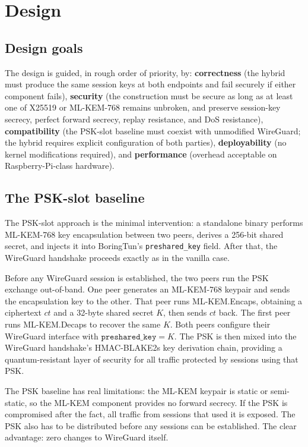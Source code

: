 \documentclass[11pt,a4paper]{article}
\begin{document}
\section{Design}
\label{sec:design}

\subsection{Design goals}

The design is guided, in rough order of priority, by: \textbf{correctness} (the hybrid must produce the same session keys at both endpoints and fail securely if either component fails), \textbf{security} (the construction must be secure as long as at least one of X25519 or ML-KEM-768 remains unbroken, and preserve session-key secrecy, perfect forward secrecy, replay resistance, and DoS resistance), \textbf{compatibility} (the PSK-slot baseline must coexist with unmodified WireGuard; the hybrid requires explicit configuration of both parties), \textbf{deployability} (no kernel modifications required), and \textbf{performance} (overhead acceptable on Raspberry-Pi-class hardware).

\subsection{The PSK-slot baseline}

The PSK-slot approach is the minimal intervention: a standalone binary performs ML-KEM-768 key encapsulation between two peers, derives a 256-bit shared secret, and injects it into BoringTun's \texttt{preshared\_key} field. After that, the WireGuard handshake proceeds exactly as in the vanilla case.

Before any WireGuard session is established, the two peers run the PSK exchange out-of-band. One peer generates an ML-KEM-768 keypair and sends the encapsulation key to the other. That peer runs ML-KEM.Encaps, obtaining a ciphertext $\mathit{ct}$ and a 32-byte shared secret $K$, then sends $\mathit{ct}$ back. The first peer runs ML-KEM.Decaps to recover the same $K$. Both peers configure their WireGuard interface with $\texttt{preshared\_key} = K$. The PSK is then mixed into the WireGuard handshake's HMAC-BLAKE2s key derivation chain, providing a quantum-resistant layer of security for all traffic protected by sessions using that PSK.

The PSK baseline has real limitations: the ML-KEM keypair is static or semi-static, so the ML-KEM component provides no forward secrecy. If the PSK is compromised after the fact, all traffic from sessions that used it is exposed. The PSK also has to be distributed before any sessions can be established. The clear advantage: zero changes to WireGuard itself.
\end{document}
